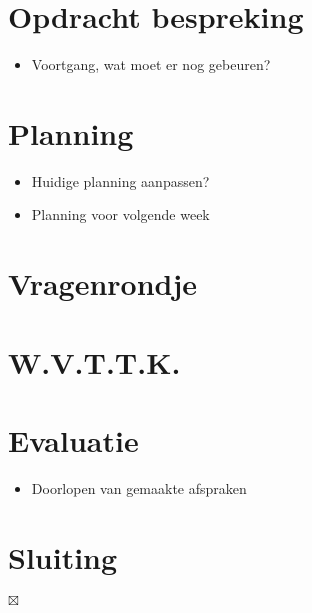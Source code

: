 \documentclass[]{article}
\begin{document}
\section{Opdracht bespreking}

  \begin{itemize}
    \item Voortgang, wat moet er nog gebeuren?
  \end{itemize}

%

\section{Planning}
  \begin{itemize}
    \item Huidige planning aanpassen?
    \item Planning voor volgende week
  \end{itemize}

\section{Vragenrondje}\label{sec:vraagrondje} %


\section{W.V.T.T.K.}\label{sec:w_v_t_t_k_} %


\section{Evaluatie}
  \begin{itemize}
    \item Doorlopen van gemaakte afspraken
  \end{itemize}

\section{Sluiting}

$\boxtimes$
\end{document}
